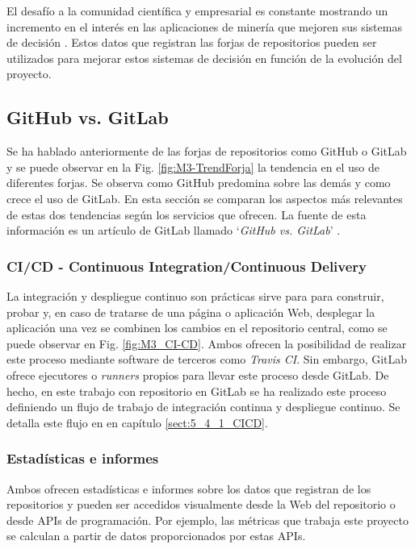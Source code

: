 El  desafío a la comunidad científica y empresarial  es constante mostrando un incremento en el interés en las aplicaciones de minería que mejoren sus sistemas de decisión \cite{guemes-pena_emerging_2018}. Estos datos que registran las forjas de repositorios pueden ser utilizados para mejorar estos sistemas de decisión en función de la evolución del proyecto.

\subsection{GitHub vs. GitLab}\label{sect:3_2_1_GitHubVSGitLab}


Se ha hablado anteriormente de las forjas de repositorios como GitHub o GitLab y se puede observar en la Fig. \ref{fig:M3-TrendForja} la tendencia en el uso de diferentes forjas. Se observa como GitHub predomina sobre las demás y como crece el uso de GitLab. En esta sección se comparan los aspectos más relevantes de estas dos tendencias según los servicios que ofrecen. La fuente de esta información es un artículo de GitLab llamado `\textit{GitHub vs. GitLab}' \cite{gitlab_github_nodate}.

\subsubsection{CI/CD - Continuous Integration/Continuous Delivery}
La integración y despliegue continuo son prácticas sirve para para construir, probar y, en caso de tratarse de una página o aplicación Web, desplegar la aplicación una vez se combinen los cambios en el repositorio central, como se puede observar en Fig. \ref{fig:M3_CI-CD}. Ambos ofrecen la posibilidad de realizar este proceso mediante software de terceros como \textit{Travis CI}. Sin embargo, GitLab ofrece ejecutores o \textit{runners} propios para llevar este proceso desde GitLab. De hecho, en este trabajo con repositorio en GitLab se ha realizado este proceso definiendo un flujo de trabajo de integración continua y despliegue continuo. Se detalla este flujo en en capítulo \ref{sect:5_4_1_CICD}.


\subsubsection{Estadísticas e informes}
Ambos ofrecen estadísticas e informes sobre los datos que registran de los repositorios y pueden ser accedidos visualmente desde la Web del repositorio o desde APIs de programación. Por ejemplo, las métricas que trabaja este proyecto se calculan a partir de datos proporcionados por estas APIs.

